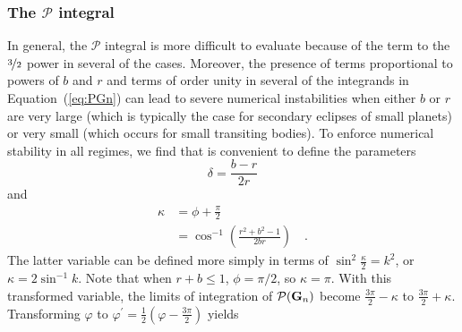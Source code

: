 \documentclass[modern]{aastex61}
\begin{document}
\subsubsection{The $\mathcal{P}$ integral}
\label{app:P}

In general, the $\mathcal{P}$ integral is more difficult to evaluate because
of the term to the $\nicefrac{3}{2}$ power in several of the cases.
Moreover, the presence of terms proportional to powers of $b$
and $r$ and terms of order unity in several of the integrands in
Equation~(\ref{eq:PGn}) can lead to severe numerical instabilities when
either $b$ or $r$ are very large (which is typically the case for secondary eclipses
of small planets) or very small (which occurs for small transiting bodies).
%
To enforce numerical stability in all regimes, we find that is convenient to
define the parameters
%
\begin{equation}
    \label{eq:delta}
    \delta = \frac{b-r}{2r}
\end{equation}
%
and
%
\begin{align}
    \label{eq:kappa}
    \kappa &= \phi + \frac{\pi}{2} \nonumber \\
           &= \cos^{-1} \left(\frac{r^2+b^2-1}{2br}\right)
           \quad.
\end{align}
%
The latter variable can be defined more simply in terms of $\sin^2\tfrac{\kappa}{2} = k^2$,
or $\kappa = 2 \sin^{-1}k$. Note that when $r+b \le 1$, $\phi=\pi/2$, so $\kappa = \pi$.
With this transformed variable, the limits of integration of $\mathcal{P}({\mathbf{G}}_n)$
become $\tfrac{3\pi}{2}-\kappa$ to $\tfrac{3\pi}{2}+\kappa$.  Transforming
$\varphi$ to $\varphi^\prime = \frac{1}{2}(\varphi - \tfrac{3\pi}{2})$ yields
%
\begingroup\makeatletter\def\f@size{9}\check@mathfonts
\def\maketag@@@#1{\hbox{\m@th\normalsize#1}}%
\end{document}
